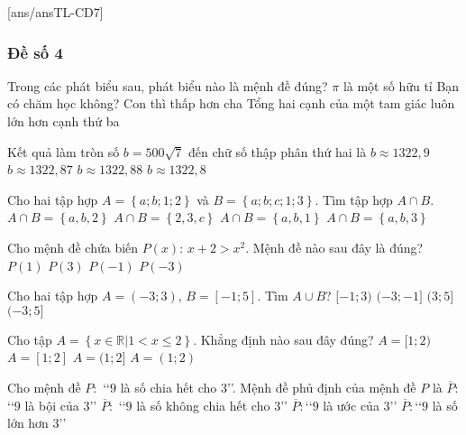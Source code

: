 [ans/ansTL-CD7]
\setcounter{ex}{0}
\subsubsection{Đề số 4}

\begin{ex}%
	Trong các phát biểu sau, phát biểu nào là mệnh đề đúng?
	\choice
	{ $\pi $ là một số hữu tỉ}
	{ Bạn có chăm học không?}
	{ Con thì thấp hơn cha}
	{ \True Tổng hai cạnh của một tam giác luôn lớn hơn cạnh thứ ba}
	\loigiai{
	}
\end{ex}

\begin{ex}%
	Kết quả làm tròn số $b=500\sqrt{7}$ đến  chữ số thập phân thứ hai là
	\choice
	{$b\approx 1322,9 $}
	{$b\approx 1322,87$}
	{\True $b\approx 1322,88$}
	{$b\approx 1322,8 $}
	\loigiai{
	}
\end{ex}

\begin{ex}%
	Cho hai tập hợp $A=\left\{a; b; 1; 2\right\}$ và $B=\left\{a; b; c; 1; 3\right\}.$ Tìm tập hợp $A\cap B.$
	\choice
	{$A\cap B=\left\{a,b,2\right\}$}
	{$A\cap B=\left\{2,3,c\right\}$}
	{\True$A\cap B=\left\{a,b,1\right\}$}
	{$A\cap B=\left\{a,b,3\right\}$}
	\loigiai{
	}
\end{ex}

\begin{ex}%
	Cho mệnh đề chứa biến $P(x)$: $x+2>x^2$. Mệnh đề nào sau đây là đúng?
	\choice
	{\True $P(1)$}
	{$P(3)$}
	{$P(-1)$}
	{$P(-3)$}
	\loigiai{
	}
\end{ex}

\begin{ex}%
	Cho hai tập hợp $A=(-3;3)$, $B=[-1;5]$. Tìm $A \cup B$?
	\choice
	{$[-1;3)$}
	{$(-3;-1]$}
	{$(3;5]$}
	{\True $(-3;5]$}
	\loigiai{
		Ta có $A \cup B=(-3;5]$.}
\end{ex}

\begin{ex}%
	Cho tập $A=\left\{x \in \mathbb{R}|1<x \leq 2\right\}$. Khẳng định nào sau đây đúng?
	\choice
	{$A=[1;2)$}
	{$A=[1;2]$}
	{\True $A=(1;2]$}
	{$A=(1;2)$}
	\loigiai{
		Ta có $A=\left\{x \in \mathbb{R}|1<x \leq 2\right\}=(1;2]$.
	}
\end{ex}


\begin{ex}%
	Cho mệnh đề $P\colon$ \lq\lq  $9$ là số chia hết cho $3$\rq\rq. Mệnh đề phủ định của mệnh đề $P$ là
	\choice
	{$\overline{P}\colon$\lq\lq  $9$ là bội của $3$\rq\rq}
	{\True $\overline{P}\colon$ \lq\lq  $9$ là số không chia hết cho $3$\rq\rq}
	{$\overline{P}\colon$\lq\lq  $9$ là ước của $3$\rq\rq}
	{$\overline{P}\colon$\lq\lq  $9$ là số lớn hơn $3$\rq\rq}
\end{ex}

